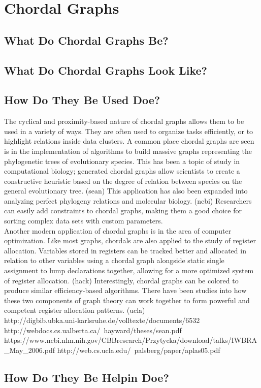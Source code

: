 \chapter{Chordal Graphs}
\section{What Do Chordal Graphs Be?}

\section{What Do Chordal Graphs Look Like?}

\section{How Do They Be Used Doe?}
The cyclical and proximity-based nature of chordal graphs allows them to be used in a variety of ways. They are often used to organize 
tasks efficiently, or to highlight relations inside data clusters. A common place chordal graphs are seen is in the implementation of algorithms to build 
massive graphs representing the phylogenetic trees of evolutionary species. This has been a topic of study in computational biology; generated chordal 
graphs allow scientists to create a constructive heuristic based on the degree of relation between species on the general evolutionary tree. (sean) This
application has also been expanded into analyzing perfect phylogeny relations and molecular biology. (ncbi) Researchers can easily add constraints to 
chordal graphs, making them a good choice for sorting complex data sets with custom parameters. \\

	Another modern application of chordal graphs is in the area of computer optimization. Like most graphs, chordals are also applied to the study of 
register allocation. Variables stored in registers can be tracked better and allocated in relation to other variables using a chordal graph alongside
static single assignment to lump declarations together, allowing for a more optimized system of register allocation. (hack) Interestingly, chordal graphs
can be colored to produce similar efficiency-based algorithms. There have been studies into how these two components of graph theory can work together to 
form powerful and competent register allocation patterns. (ucla) \\

http://digbib.ubka.uni-karlsruhe.de/volltexte/documents/6532
http://webdocs.cs.ualberta.ca/~hayward/theses/sean.pdf
https://www.ncbi.nlm.nih.gov/CBBresearch/Przytycka/download/talks/IWBRA_May_2006.pdf
http://web.cs.ucla.edu/~palsberg/paper/aplas05.pdf

\section{How Do They Be Helpin Doe?}
